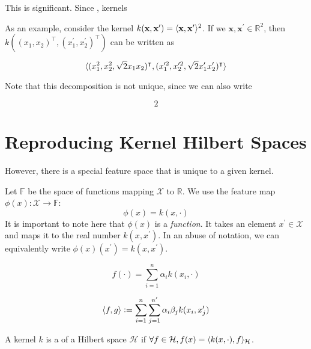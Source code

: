 This is significant. Since , kernels 

As an example, consider the kernel $k(\mathbf{x}, \mathbf{x}^\prime) = \langle\mathbf{x}, \mathbf{x}^\prime\rangle^2$. If we $\mathbf{x}, \mathbf{x}^\prime \in \mathbb{R}^2$, then $k((x_1, x_2)^\intercal, (x_1^\prime, x_2^\prime)^\intercal)$ can be written as

\begin{equation}
\langle(x_1^2, x_2^2, \sqrt{2} x_1 x_2)^\intercal, (x_1^{\prime 2}, x_2^{\prime 2}, \sqrt{2} x_1^\prime x_2^\prime)^\intercal\rangle
\end{equation}

Note that this decomposition is not unique, since we can also write

\begin{equation}
2
\end{equation}

\section{Reproducing Kernel Hilbert Spaces}
However, there is a special feature space that is unique to a given kernel. 

Let $\mathbb{F}$ be the space of functions mapping $\mathcal{X}$ to $\mathbb{R}$. We use the feature map $\phi(x) : \mathcal{X} \to \mathbb{F}$:
\begin{equation}
	\phi(x) = k(x, \cdot)
\end{equation}
It is important to note here that $\phi(x)$ is a \emph{function}. It takes an element $x^\prime \in \mathcal{X}$ and maps it to the real number $k(x, x^\prime)$. In an abuse of notation, we can equivalently write $\phi(x)(x^\prime) = k(x, x^\prime)$.

\begin{equation}
	f(\cdot) = \sum_{i=1}^n \alpha_i k(x_i, \cdot)
\end{equation}

\begin{equation}
	\langle f, g\rangle \vcentcolon= \sum_{i=1}^n \sum_{j=1}^{n^\prime} \alpha_i \beta_j k(x_i, x_j^\prime)
\end{equation}

\begin{definition}
	A kernel $k$ is a  of a Hilbert space $\mathcal{H}$ if $\forall f \in \mathcal{H}, f(x) = \langle k(x, \cdot), f\rangle_\mathcal{H}$.
\end{definition}


